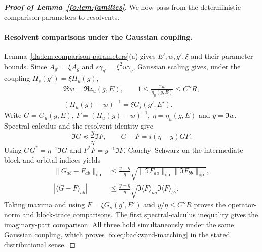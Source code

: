 \documentclass[11pt]{article}
\numberwithin{equation}{section}
\theoremstyle{remark}
\newcommand{\op}{\mathrm{op}}
\begin{document}
\begin{proof}[\textbf{Proof of Lemma~\ref{fo:lem:families}}]
We now pass from the deterministic comparison parameters to resolvents.
\paragraph{Resolvent comparisons under the Gaussian coupling.}
Lemma~\ref{da:lem:comparison-parameters}(a) gives $E',w,g',\xi$ and
their parameter bounds. Since $A_{g'}=\xi A_g$ and
$s\gamma_{g'}=\xi^2u\gamma_g$, Gaussian scaling gives,
under the coupling $H_s(g')=\xi H_u(g)$,
\begin{equation}\label{fo:eq:comparison-point}
 \begin{gathered}
 \Re w=\Re z_u(g,E),\qquad
 1\le\frac{\Im w}{\eta_u(g,E)}\le C''R,\\
 (H_u(g)-w)^{-1}=\xi G_s(g',E').
 \end{gathered}
\end{equation}
Write $G=G_u(g,E)$, $F=(H_u(g)-w)^{-1}$,
$\eta=\eta_u(g,E)$ and $y=\Im w$. Spectral calculus and the
resolvent identity give
\[
 \Im G\preceq\frac y\eta\Im F,\qquad
 G-F=i(\eta-y)GF.
\]
Using $GG^*=\eta^{-1}\Im G$ and $F^*F=y^{-1}\Im F$,
Cauchy--Schwarz on the intermediate block and orbital indices yields
\[
 \begin{aligned}
 \|G_{ab}-F_{ab}\|_{\op}
 &\le\frac{y-\eta}{\eta}
   \sqrt{\|\Im F_{aa}\|_{\op}\|\Im F_{bb}\|_{\op}},\\
 |\langle G-F\rangle_{ab}|
 &\le\frac{y-\eta}{\eta}
   \sqrt{\Im\langle F\rangle_{aa}\Im\langle F\rangle_{bb}}.
 \end{aligned}
\]
Taking maxima and using $F=\xi G_s(g',E')$ and
$y/\eta\le C''R$ proves the operator-norm and block-trace comparisons.
The first spectral-calculus inequality gives the imaginary-part comparison.
All three hold simultaneously under the same Gaussian coupling, which proves
\eqref{fo:eq:backward-matching} in the stated distributional sense.
\end{proof}
\end{document}
